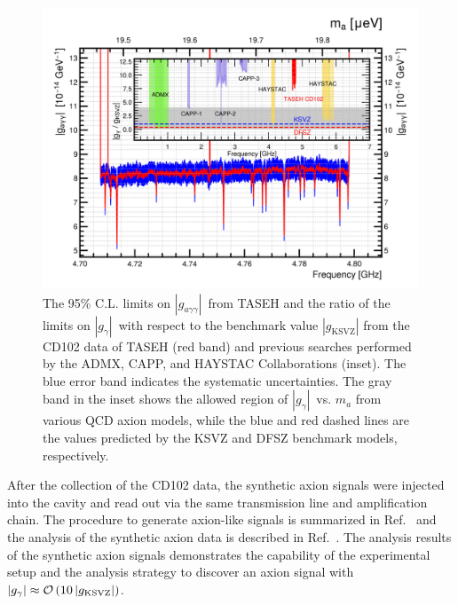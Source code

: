 \documentclass[%
 reprint,prl, %
superscriptaddress,
 amsmath,amssymb,
 aps,
]{revtex4-2}
\newcommand{\gagg}{\ensuremath{\left|g_{a\gamma\gamma}\right|}}
\newcommand{\ggamma}{\ensuremath{\left|g_{\gamma}\right|}}
\begin{document}
\begin{figure} [htbp]
  \centering
  \includegraphics[width=12.9cm]{figures/combineTASEH_all.png}
  \caption{The 95\% C.L. limits on \gagg\ from TASEH and the ratio of the 
limits on \ggamma\ with respect to 
the benchmark value $\left|g_\text{KSVZ}\right|$ 
 from the CD102 data of TASEH (red band) and previous searches performed by the ADMX, CAPP, and HAYSTAC Collaborations (inset). 
 The blue error band indicates the systematic 
  uncertainties. The gray band in the inset shows the allowed region of 
 \ggamma\ vs. $m_a$ 
 from various QCD axion models, while the blue and red dashed lines are the 
values predicted by the KSVZ and DFSZ benchmark models, respectively.
 }

  \label{fig:gaggall}
\end{figure}




After the collection of the CD102 data, 
the synthetic axion signals were injected into the cavity and read out via the 
same transmission line and amplification chain. 
The procedure to generate axion-like signals is summarized in 
Ref.~\cite{TASEHInstrumentation} and the analysis of the synthetic axion 
data is described in Ref.~\cite{TASEHAnalysis}. 
The analysis results of the synthetic axion signals demonstrates
the capability of the experimental setup and the analysis strategy to discover
an axion signal with 
$\ggamma\approx {\cal O}\left(10\left|g_\text{KSVZ}\right|\right)$.
\end{document}
